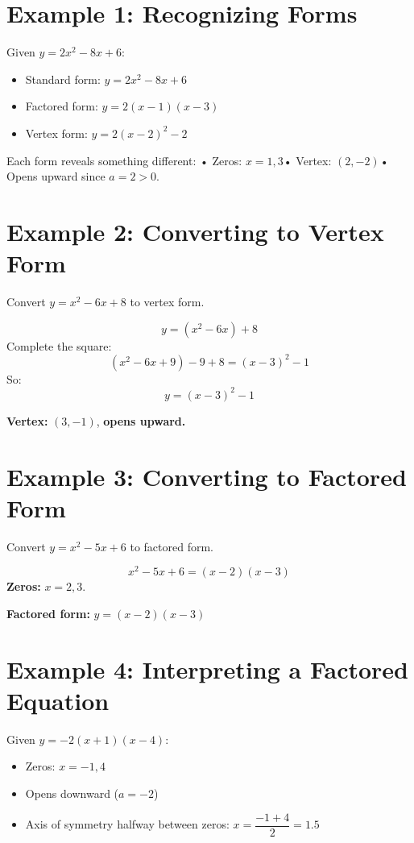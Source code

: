 \documentclass[14pt]{extarticle}
\begin{document}
\section*{Example 1: Recognizing Forms}

Given \(y = 2x^2 - 8x + 6\):
\begin{itemize}
  \item Standard form: \(y = 2x^2 - 8x + 6\)
  \item Factored form: \(y = 2(x - 1)(x - 3)\)
  \item Vertex form: \(y = 2(x - 2)^2 - 2\)
\end{itemize}

Each form reveals something different:  
• Zeros: \(x = 1, 3\)• Vertex: \((2, -2)\)• Opens upward since \(a = 2 > 0\).

\section*{Example 2: Converting to Vertex Form}

Convert \(y = x^2 - 6x + 8\) to vertex form.

\[
y = (x^2 - 6x) + 8
\]
Complete the square:
\[
(x^2 - 6x + 9) - 9 + 8 = (x - 3)^2 - 1
\]
So:
\[
y = (x - 3)^2 - 1
\]

\textbf{Vertex:} \((3, -1)\), \textbf{opens upward.}

\section*{Example 3: Converting to Factored Form}

Convert \(y = x^2 - 5x + 6\) to factored form.

\[
x^2 - 5x + 6 = (x - 2)(x - 3)
\]
\textbf{Zeros:} \(x = 2, 3.\)

\textbf{Factored form:} \(\boxed{y = (x - 2)(x - 3)}\)

\section*{Example 4: Interpreting a Factored Equation}

Given \(y = -2(x + 1)(x - 4)\):
\begin{itemize}
  \item Zeros: \(x = -1, 4\)
  \item Opens downward (\(a = -2\))
  \item Axis of symmetry halfway between zeros: \(x = \dfrac{-1 + 4}{2} = 1.5\)
\end{itemize}
\end{document}
